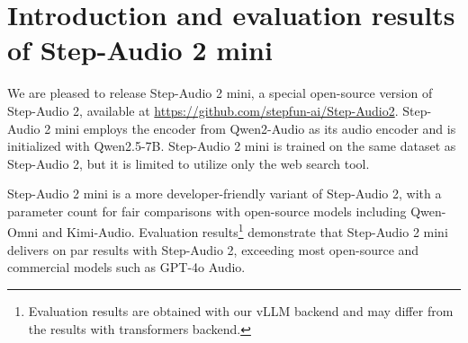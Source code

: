 \section{Introduction and evaluation results of Step-Audio 2 mini}

We are pleased to release Step-Audio 2 mini, a special open-source version of Step-Audio 2, available at \url{https://github.com/stepfun-ai/Step-Audio2}.
Step-Audio 2 mini employs the encoder from Qwen2-Audio as its audio encoder and is initialized with Qwen2.5-7B.
Step-Audio 2 mini is trained on the same dataset as Step-Audio 2, but it is limited to utilize only the web search tool.

Step-Audio 2 mini is a more developer-friendly variant of Step-Audio 2, with a parameter count for fair comparisons with open-source models including Qwen-Omni and Kimi-Audio. Evaluation results\footnote{Evaluation results are obtained with our vLLM backend and may differ from the results with transformers backend.} demonstrate that Step-Audio 2 mini delivers on par results with Step-Audio 2, exceeding most open-source and commercial models such as GPT-4o Audio.


